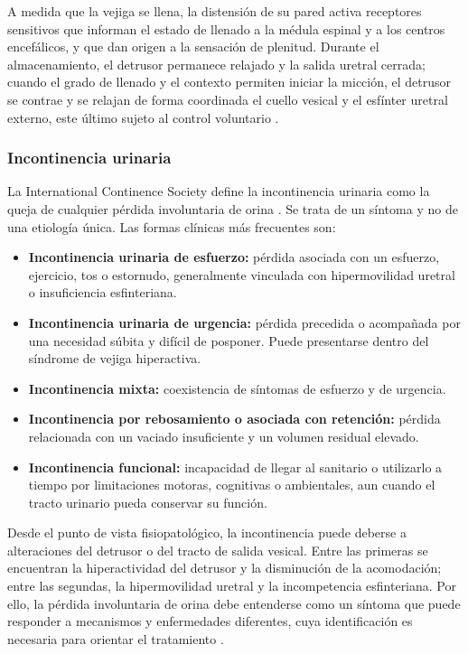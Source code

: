 \documentclass[12pt,a4paper]{article}
\begin{document}
A medida que la vejiga se llena, la distensión de su pared activa receptores sensitivos que informan
el estado de llenado a la médula espinal y a los centros encefálicos, y que dan origen a la sensación
de plenitud. Durante el almacenamiento, el detrusor permanece relajado y la salida uretral cerrada;
cuando el grado de llenado y el contexto permiten iniciar la micción, el detrusor se contrae y se
relajan de forma coordinada el cuello vesical y el esfínter uretral externo, este último sujeto al
control voluntario \cite{fowler2008neural,lanzotti2023physiology}.


\subsubsection{Incontinencia urinaria}

La International Continence Society define la incontinencia urinaria como la queja de cualquier pérdida
involuntaria de orina \cite{abrams2002standardisation}. Se trata de un síntoma y no de una etiología
única. Las formas clínicas más frecuentes son:

\begin{itemize}
    \item \textbf{Incontinencia urinaria de esfuerzo:} pérdida asociada con un esfuerzo, ejercicio,
    tos o estornudo, generalmente vinculada con hipermovilidad uretral o insuficiencia esfinteriana.
    \item \textbf{Incontinencia urinaria de urgencia:} pérdida precedida o acompañada por una necesidad
    súbita y difícil de posponer. Puede presentarse dentro del síndrome de vejiga hiperactiva.
    \item \textbf{Incontinencia mixta:} coexistencia de síntomas de esfuerzo y de urgencia.
    \item \textbf{Incontinencia por rebosamiento o asociada con retención:} pérdida relacionada con un
    vaciado insuficiente y un volumen residual elevado.
    \item \textbf{Incontinencia funcional:} incapacidad de llegar al sanitario o utilizarlo a tiempo
    por limitaciones motoras, cognitivas o ambientales, aun cuando el tracto urinario pueda conservar
    su función.
\end{itemize}

Desde el punto de vista fisiopatológico, la incontinencia puede deberse a alteraciones del detrusor o
del tracto de salida vesical. Entre las primeras se encuentran la hiperactividad del detrusor y la
disminución de la acomodación; entre las segundas, la hipermovilidad uretral y la incompetencia
esfinteriana. Por ello, la pérdida involuntaria de orina debe entenderse como un síntoma que puede
responder a mecanismos y enfermedades diferentes, cuya identificación es necesaria para orientar el
tratamiento \cite{chiang2013incontinencia}.
\end{document}
